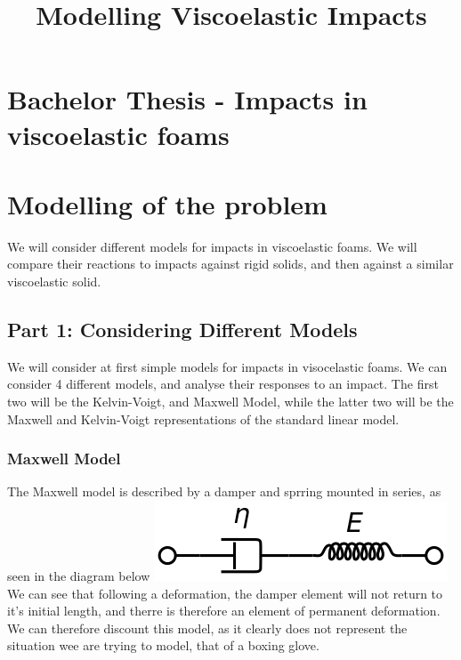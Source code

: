 \documentclass[11pt]{article}
\title{Modelling Viscoelastic Impacts}
\makeatletter
\def\maxwidth{\ifdim\Gin@nat@width>\linewidth\linewidth
    \else\Gin@nat@width\fi}
\let\Oldincludegraphics\includegraphics
\renewcommand{\includegraphics}[1]{\Oldincludegraphics[width=.8\maxwidth]{#1}}
\makeatother
\begin{document}
    
    
    \maketitle
    
    

    
    \section{Bachelor Thesis - Impacts in viscoelastic
foams}\label{bachelor-thesis---impacts-in-viscoelastic-foams}

\section{Modelling of the problem}\label{modelling-of-the-problem}

    We will consider different models for impacts in viscoelastic foams. We
will compare their reactions to impacts against rigid solids, and then
against a similar viscoelastic solid.

    \subsection{Part 1: Considering Different
Models}\label{part-1-considering-different-models}

    We will consider at first simple models for impacts in visocelastic
foams. We can consider 4 different models, and analyse their responses
to an impact. The first two will be the Kelvin-Voigt, and Maxwell Model,
while the latter two will be the Maxwell and Kelvin-Voigt
representations of the standard linear model.

    \subsubsection{Maxwell Model}\label{maxwell-model}

The Maxwell model is described by a damper and sprring mounted in
series, as seen in the diagram below
\includegraphics{images/maxwell.png} We can see that following a
deformation, the damper element will not return to it's initial length,
and therre is therefore an element of permanent deformation. We can
therefore discount this model, as it clearly does not represent the
situation wee are trying to model, that of a boxing glove.
\end{document}

